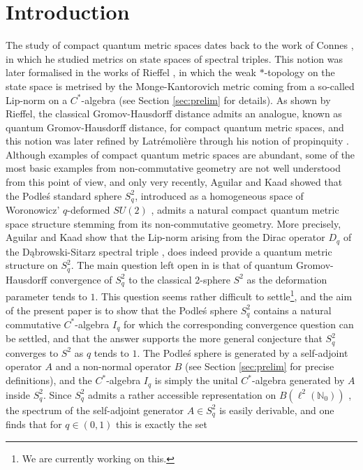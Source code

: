 \documentclass[11pt, reqno, a4paper, final]{amsart}
\theoremstyle{plain}
\theoremstyle{definition}
\newcommand{\NN}{{\mathbb N}}
\newcommand{\black}{\color{black}}
\begin{document}
\section{Introduction}
The study of compact quantum metric spaces dates back to the work of Connes \cite{Connes}, in which he studied metrics on state spaces of spectral triples. This notion was later formalised in the works of Rieffel \cite{Rieffel-1,Rieffel-2,Rieffel-4}, in which the weak $*$-topology on the state space is metrised by the Monge-Kantorovich metric coming from a so-called Lip-norm on a $C^*$-algebra (see Section \ref{sec:prelim} for details).  As shown by Rieffel, the classical Gromov-Hausdorff distance admits an analogue, known as quantum Gromov-Hausdorff distance, for compact quantum metric spaces, and this notion was later refined by   Latrémolière through his notion of propinquity \cite{Latremoliere}. Although examples of compact quantum metric spaces are abundant,  some of the most basic examples from non-commutative geometry are not well understood from this point of view, and only very recently,  Aguilar and Kaad \cite{Kaad-Aguilar} showed that the Podle\'s standard sphere $S_q^2$, introduced as a homogeneous space of Woronowicz' $q$-deformed $SU(2)$ \cite{Podles,Woronowicz-SU2}, admits a natural compact quantum metric space structure stemming from its non-commutative geometry. More precisely, Aguilar and Kaad show that the Lip-norm arising from the Dirac operator  ${D_q}$ of the Dąbrowski-Sitarz spectral triple \cite{Dabrowski-Sitarz}, does indeed provide a quantum metric structure on $S_q^2$. The main question left open in \cite{Kaad-Aguilar} is that  of quantum Gromov-Hausdorff convergence of $S_q^2$ to the classical $2$-sphere $S^2$ as the deformation parameter tends to $1$. This question seems rather difficult to settle\footnote{We are currently working on this.}, and the aim of the present paper is to show that the Podle\'s sphere $S_q^2$ contains a natural commutative $C^*$-algebra $I_q$ for which the corresponding convergence question can be settled, and that the answer supports the more general conjecture that $S_q^2$ converges to $S^2$ as $q$ tends to $1$.  The Podle\'s sphere is generated by a self-adjoint operator $A$ and a {\black non-normal} operator $B$ (see Section \ref{sec:prelim} for precise definitions), and the $C^*$-algebra $I_q$ is simply the unital $C^*$-algebra generated by $A$ inside $S_q^2$. 
Since $S_q^2$ admits a rather accessible representation on $B(\ell^2(\NN_0))$ \cite[Proposition 4]{Podles}, the spectrum of the self-adjoint generator $A\in S_q^2$ is easily derivable,  and one finds that for  $q\in(0,1)$ this is exactly the set
\end{document}
